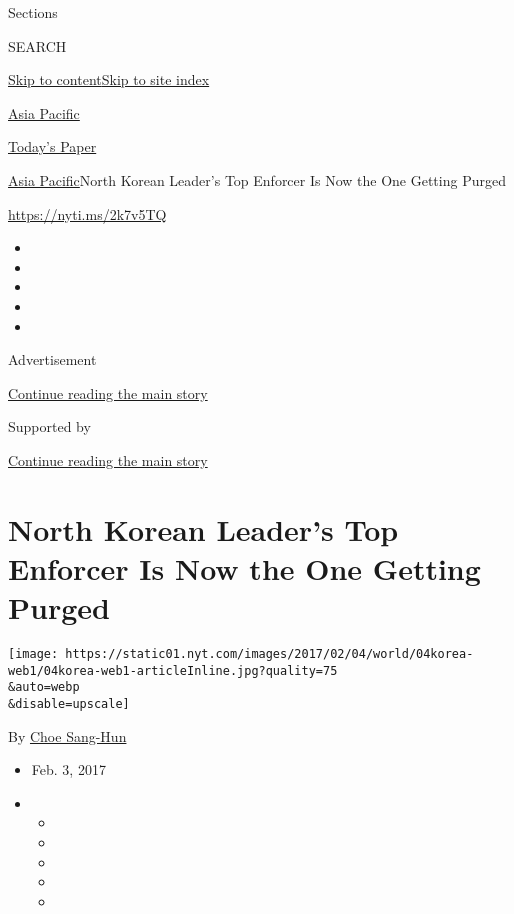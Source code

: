 Sections

SEARCH

\protect\hyperlink{site-content}{Skip to
content}\protect\hyperlink{site-index}{Skip to site index}

\href{https://www.nytimes.com/section/world/asia}{Asia Pacific}

\href{https://myaccount.nytimes.com/auth/login?response_type=cookie\&client_id=vi}{}

\href{https://www.nytimes.com/section/todayspaper}{Today's Paper}

\href{/section/world/asia}{Asia Pacific}\textbar{}North Korean Leader's
Top Enforcer Is Now the One Getting Purged

\url{https://nyti.ms/2k7v5TQ}

\begin{itemize}
\item
\item
\item
\item
\item
\end{itemize}

Advertisement

\protect\hyperlink{after-top}{Continue reading the main story}

Supported by

\protect\hyperlink{after-sponsor}{Continue reading the main story}

\hypertarget{north-korean-leaders-top-enforcer-is-now-the-one-getting-purged}{%
\section{North Korean Leader's Top Enforcer Is Now the One Getting
Purged}\label{north-korean-leaders-top-enforcer-is-now-the-one-getting-purged}}

\texttt{[image: https://static01.nyt.com/images/2017/02/04/world/04korea-web1/04korea-web1-articleInline.jpg?quality=75\\\&auto=webp\\\&disable=upscale]}

By \href{http://www.nytimes.com/by/choe-sang-hun}{Choe Sang-Hun}

\begin{itemize}
\item
  Feb. 3, 2017
\item
  \begin{itemize}
  \item
  \item
  \item
  \item
  \item
  \end{itemize}
\end{itemize}

